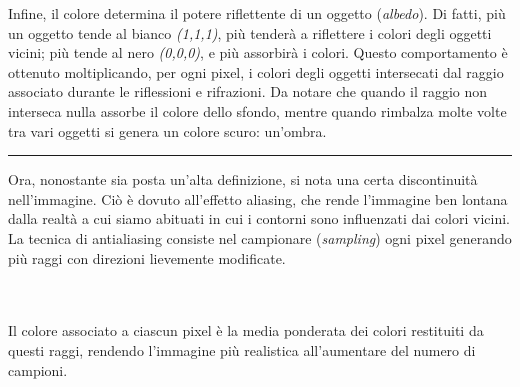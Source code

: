 \documentclass[main.tex]{subfiles}
\begin{document}
Infine, il colore determina il potere riflettente di un oggetto (\textit{albedo}). Di fatti, più un oggetto tende al bianco \textit{(1,1,1)}, più tenderà a riflettere i colori degli oggetti vicini; più tende al nero \textit{(0,0,0)}, e più assorbirà i colori. Questo comportamento è ottenuto moltiplicando, per ogni pixel, i colori degli oggetti intersecati dal raggio associato durante le riflessioni e rifrazioni. 
Da notare che quando il raggio non interseca nulla assorbe il colore dello sfondo, mentre quando rimbalza molte volte tra vari oggetti si genera un colore scuro: un'ombra. \\
\begin{minipage}{0.4\textwidth}
    \centering
    \captionsetup{aboveskip=0pt}
    \vspace{-14pt}\rule{0.6\linewidth}{0.4pt}
\end{minipage}%
\begin{minipage}{0.6\textwidth}
  \hspace*{0.25in}Ora, nonostante sia posta un'alta definizione, si nota una certa discontinuità nell'immagine. Ciò è dovuto all'effetto aliasing, che rende l'immagine ben lontana dalla realtà a cui siamo abituati in cui i contorni sono influenzati dai colori vicini. La tecnica di antialiasing consiste nel campionare (\textit{sampling}) ogni pixel generando più raggi con direzioni lievemente modificate. 
\end{minipage}\\\\
Il colore associato a ciascun pixel è la media ponderata dei colori restituiti da questi raggi, rendendo l'immagine più realistica all'aumentare del numero di campioni.
\end{document}
